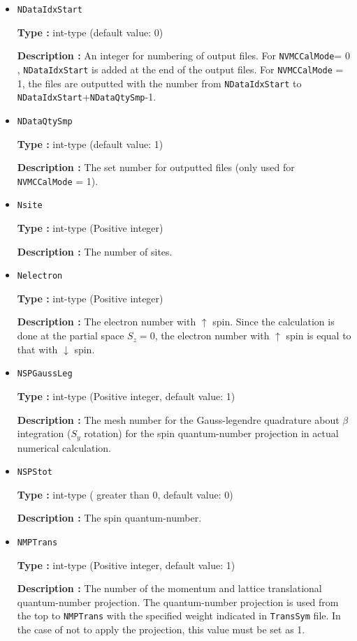 \begin{itemize}
 \item  \verb|NDataIdxStart|

 {\bf Type :} int-type (default value: 0)

{\bf Description :} An integer for numbering of output files. For \verb|NVMCCalMode|= 0 , \verb|NDataIdxStart| is added at the end of the output files. For \verb|NVMCCalMode| = 1,  the files are outputted with the number from \verb|NDataIdxStart| to  \verb|NDataIdxStart|+\verb|NDataQtySmp|-1.
   
 \item  \verb|NDataQtySmp|

 {\bf Type :} int-type (default value: 1)

{\bf Description :} The set number for outputted files (only used for \verb|NVMCCalMode| = 1). 

 \item  \verb|Nsite|

{\bf Type :} int-type (Positive integer)

{\bf Description :} The number of sites.  

\item  \verb|Nelectron|

{\bf Type :} int-type (Positive integer)

{\bf Description :} The electron number with $\uparrow$ spin. Since the calculation is done at the partial space $S_z=0$,  the electron number with $\uparrow$ spin is equal to that with $\downarrow$ spin.

 \item  \verb|NSPGaussLeg|

{\bf Type :} {int-type (Positive integer, default value: 1)}

{\bf Description :} The mesh number for the Gauss-legendre quadrature about $\beta$ integration ($S_y$ rotation) for the spin quantum-number projection in actual numerical calculation.

 \item  \verb|NSPStot|

{\bf Type :} int-type ( greater than 0,  default value: 0)

{\bf Description :}   The spin quantum-number. 

 \item  \verb|NMPTrans|

{\bf Type :} int-type (Positive integer, default value: 1)

{\bf Description :} 
The number of the momentum and lattice translational quantum-number projection. The quantum-number projection is used from the top to \verb|NMPTrans| with the specified weight indicated in \verb|TransSym| file. In the case of not to apply the projection, this value must be set as 1.


\end{itemize}
